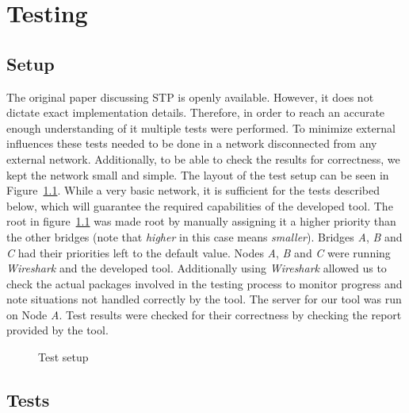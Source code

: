 \chapter{Testing}
\section{Setup}
The original paper discussing STP \cite{perlman85} is openly available.
However, it does not dictate exact implementation details.
Therefore, in order to reach an accurate enough understanding of it multiple tests were performed.
To minimize external influences these tests needed to be done in a network disconnected from any external network.
Additionally, to be able to check the results for correctness, we kept the network small and simple.
The layout of the test setup can be seen in Figure~\ref{fig:test_setup}.
While a very basic network, it is sufficient for the tests described below, which will guarantee the required capabilities of the developed tool.
The root in figure~\ref{fig:test_setup} was made root by manually assigning it a higher priority than the other bridges (note that \textit{higher} in this case means \textit{smaller}).
Bridges \textit{A}, \textit{B} and \textit{C} had their priorities left to the default value.
Nodes \textit{A}, \textit{B} and \textit{C} were running \textit{Wireshark} and the developed tool.
Additionally using \textit{Wireshark} allowed us to check the actual packages involved in the testing process to monitor progress and note situations not handled correctly by the tool.
The server for our tool was run on Node \textit{A}.
Test results were checked for their correctness by checking the report provided by the tool.

\begin{figure}[h]
    \centering
    \caption{Test setup}
    \label{fig:test_setup}
\end{figure}

\section{Tests}
